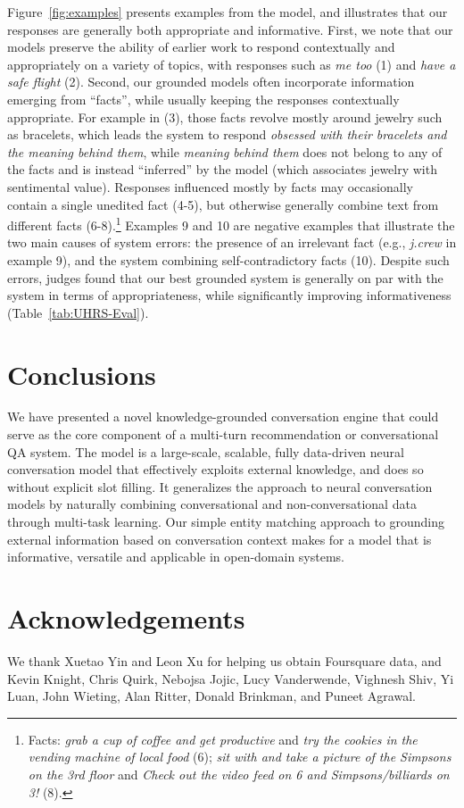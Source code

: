 \documentclass[letterpaper]{article}
\begin{document}
Figure~\ref{fig:examples} presents examples from the \MTaskRF model, and illustrates that our responses are generally both appropriate and informative. First, we note that our models preserve the ability of earlier work \cite{sordoni2015,vinyals2015neural} to respond contextually and appropriately on a variety of topics, with responses such as {\it me too} (1) and {\it have a safe flight} (2). Second, our grounded models often incorporate information emerging from ``facts'', while usually keeping the responses contextually appropriate. For example in (3), those facts revolve mostly around jewelry such as bracelets, which leads the system to respond {\it obsessed with their bracelets and the meaning behind them}, while {\it meaning behind them} does not belong to any of the facts and is instead ``inferred'' by the model (which associates jewelry with sentimental value). Responses influenced mostly by facts may occasionally contain a single unedited fact (4-5), but otherwise generally combine text from different facts (6-8).\footnote{Facts: {\it grab a cup of coffee and get productive} and {\it try the cookies in the vending machine of local food} (6); {\it sit with and take a picture of the Simpsons on the 3rd floor} and {\it Check out the video feed on 6 and Simpsons/billiards on 3!} (8).} Examples 9 and 10 are negative examples that illustrate the two main causes of system errors: the presence of an irrelevant fact (e.g., {\it j.crew } in example 9), and the system combining self-contradictory facts (10).  Despite such errors, judges found that our best grounded system is generally on par with the \sts{} system in terms of appropriateness, while significantly improving informativeness (Table~\ref{tab:UHRS-Eval}).

\section{Conclusions}

We have presented a novel knowledge-grounded conversation engine that could serve as the core component of a multi-turn recommendation or conversational QA system.
The model is a large-scale, scalable, fully data-driven neural conversation model that effectively exploits external knowledge, and does so without explicit slot filling.
It generalizes the \sts{} approach to neural conversation models by naturally combining conversational and non-conversational data through multi-task learning. 
Our simple entity matching approach to grounding external information based on conversation context makes for a model that is informative, versatile and applicable in open-domain systems. 

\section*{Acknowledgements}
We thank Xuetao Yin and Leon Xu for helping us obtain Foursquare data, and Kevin Knight, Chris Quirk, Nebojsa Jojic, Lucy Vanderwende, Vighnesh Shiv, Yi Luan, John Wieting, Alan Ritter, Donald Brinkman, and Puneet Agrawal.



\end{document}

